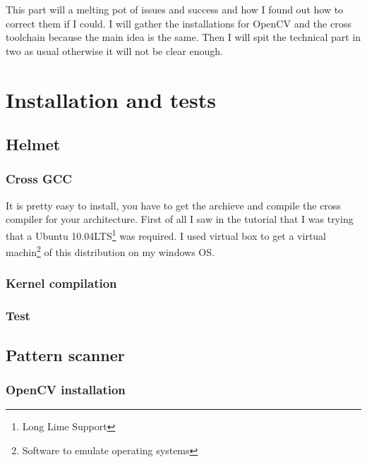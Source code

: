\documentclass[english,a4paper,11pt]{report}
\begin{document}
	
	
	
	
	\tableofcontents
	\newpage
	
	\setcounter{page}{1}
	
	
	
	
	
	
	
	\par This part will a melting pot of issues and success and how I found out how to correct them if I could. I will gather the installations for OpenCV and the cross toolchain because the main idea is the same. Then I will spit the technical part in two as usual otherwise it will not be clear enough.	
	
	\section{Installation and tests}
	
	\subsection{Helmet}
	\subsubsection{Cross GCC}
	
	\par It is pretty easy to install, you have to get the archieve and compile the cross compiler for your architecture. First of all I saw in the tutorial that I was trying that a Ubuntu 10.04LTS\footnote{Long Lime Support} was required. I used virtual box to get a virtual machin\footnote{Software to emulate operating systems} of this distribution on my windows OS.	
	
	\subsubsection{Kernel compilation}
	\subsubsection{Test}
	
	\subsection{Pattern scanner}
	\subsubsection{OpenCV installation}
\end{document}

